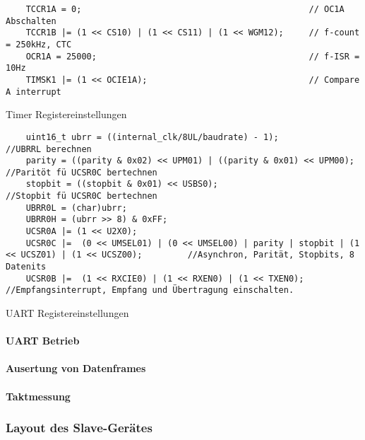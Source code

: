 \begin{listing}[H]
    \begin{verbatim}
    TCCR1A = 0;                                             // OC1A Abschalten
    TCCR1B |= (1 << CS10) | (1 << CS11) | (1 << WGM12);     // f-count = 250kHz, CTC
    OCR1A = 25000;                                          // f-ISR = 10Hz
    TIMSK1 |= (1 << OCIE1A);                                // Compare A interrupt
    \end{verbatim}
    \caption{Timer Registereinstellungen}
\end{listing}


\begin{listing}[H]
    \begin{verbatim}
    uint16_t ubrr = ((internal_clk/8UL/baudrate) - 1);                      //UBRRL berechnen
    parity = ((parity & 0x02) << UPM01) | ((parity & 0x01) << UPM00);       //Paritöt fü UCSR0C bertechnen
    stopbit = ((stopbit & 0x01) << USBS0);                                  //Stopbit fü UCSR0C bertechnen
    UBRR0L = (char)ubrr;
    UBRR0H = (ubrr >> 8) & 0xFF;
    UCSR0A |= (1 << U2X0);
    UCSR0C |=  (0 << UMSEL01) | (0 << UMSEL00) | parity | stopbit | (1 << UCSZ01) | (1 << UCSZ00);         //Asynchron, Parität, Stopbits, 8 Datenits
    UCSR0B |=  (1 << RXCIE0) | (1 << RXEN0) | (1 << TXEN0);                 //Empfangsinterrupt, Empfang und Übertragung einschalten.      
    \end{verbatim}
    \caption{UART Registereinstellungen}
\end{listing}
                             


\paragraph{UART Betrieb}\mbox{} 

\paragraph{Ausertung von Datenframes}\mbox{} 

\paragraph{Taktmessung}\mbox{} 

\subsubsection{Layout des Slave-Gerätes}
